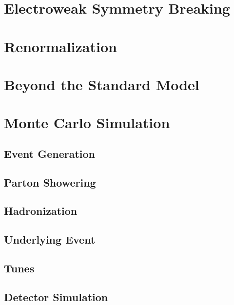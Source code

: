 % 
\section{Electroweak Symmetry Breaking}
\section{Renormalization}
\section{Beyond the Standard Model}

\section{Monte Carlo Simulation}

\subsection{Event Generation}

\subsection{Parton Showering}

\subsection{Hadronization}

\subsection{Underlying Event}

\subsection{Tunes}

\subsection{Detector Simulation}
% 